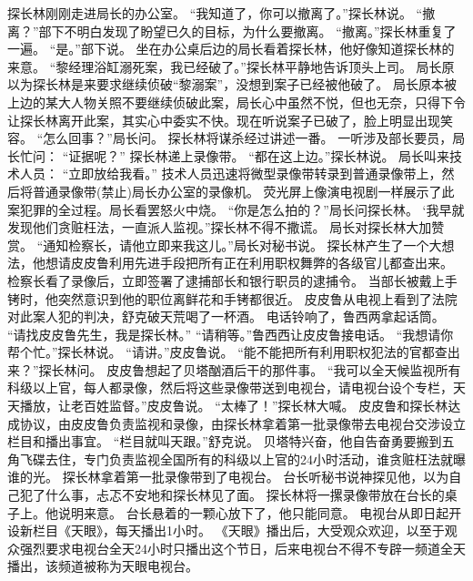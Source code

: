 \documentclass[a4paper,12pt,UTF8,twoside]{ctexbook}
\begin{document}
        探长林刚刚走进局长的办公室。  
        “我知道了，你可以撤离了。”探长林说。  
        “撤离？”部下不明白发现了盼望已久的目标，为什么要撤离。  
        “撤离。”探长林重复了一遍。  
        “是。”部下说。  
        坐在办公桌后边的局长看着探长林，他好像知道探长林的来意。  
        “黎经理浴缸溺死案，我已经破了。”探长林平静地告诉顶头上司。  
        局长原以为探长林是来要求继续侦破“黎溺案”，没想到案子已经被他破了。  
        局长原本被上边的某大人物关照不要继续侦破此案，局长心中虽然不悦，但也无奈，只得下令让探长林离开此案，其实心中委实不快。现在听说案子已破了，脸上明显出现笑容。  
        “怎么回事？”局长问。        
        探长林将谋杀经过讲述一番。  
        一听涉及部长要员，局长忙问：  
        “证据呢？”  
        探长林递上录像带。  
        “都在这上边。”探长林说。  
        局长叫来技术人员：  
        “立即放给我看。”  
        技术人员迅速将微型录像带转录到普通录像带上，然后将普通录像带(禁止)局长办公室的录像机。  
        荧光屏上像演电视剧一样展示了此案犯罪的全过程。局长看罢怒火中烧。  
        “你是怎么拍的？”局长问探长林。  
        ‘我早就发现他们贪赃枉法，一直派人监视。”探长林不得不撒谎。  
        局长对探长林大加赞赏。  
        “通知检察长，请他立即来我这儿。”局长对秘书说。  
        探长林产生了一个大想法，他想请皮皮鲁利用先进手段把所有正在利用职权舞弊的各级官儿都查出来。  
        检察长看了录像后，立即签署了逮捕部长和银行职员的逮捕令。  
        当部长被戴上手铐时，他突然意识到他的职位离鲜花和手铐都很近。        
        皮皮鲁从电视上看到了法院对此案人犯的判决，舒克破天荒喝了一杯酒。  
        电话铃响了，鲁西两拿起话筒。  
        “请找皮皮鲁先生，我是探长林。”  
        “请稍等。”鲁西西让皮皮鲁接电话。  
        “我想请你帮个忙。”探长林说。  
        “请讲。”皮皮鲁说。  
        “能不能把所有利用职权犯法的官都查出来？”探长林问。  
        皮皮鲁想起了贝塔酗酒后干的那件事。  
        “我可以全天候监视所有科级以上官，每人都录像，然后将这些录像带送到电视台，请电视台设个专栏，天天播放，让老百姓监督。”皮皮鲁说。  
        “太棒了！”探长林大喊。  
        皮皮鲁和探长林达成协议，由皮皮鲁负责监视和录像，由探长林拿着第一批录像带去电视台交涉设立栏目和播出事宜。  
        “栏目就叫天跟。”舒克说。  
        贝塔特兴奋，他自告奋勇要搬到五角飞碟去住，专门负责监视全国所有的科级以上官的24小时活动，谁贪赃枉法就曝谁的光。  
        探长林拿着第一批录像带到了电视台。  
        台长听秘书说神探见他，以为自己犯了什么事，忐忑不安地和探长林见了面。        
        探长林将一摞录像带放在台长的桌子上。他说明来意。  
        台长悬着的一颗心放下了，他只能同意。  
        电视台从即日起开设新栏目《天眼》，每天播出1小时。  
        《天眼》播出后，大受观众欢迎，以至于观众强烈要求电视台全天24小时只播出这个节日，后来电视台不得不专辟一频道全天播出，该频道被称为天眼电视台。  
\end{document}
